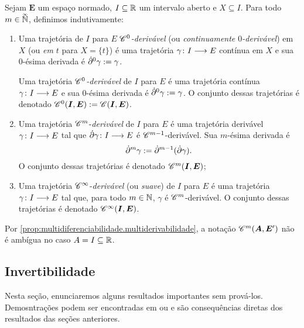 \begin{definition}
Sejam $\bm E$ um espaço normado, $I \subseteq \mathbb{R}$ um intervalo aberto e $X \subseteq I$. Para todo $m \in \accentset{\infty}{\mathbb{N}}$, definimos indutivamente:
	\begin{enumerate}
	\item Uma trajetória de $I$ para $E$ \emph{$\mathscr{C}^0$-derivável} (ou \emph{continuamente $0$-derivável}) em $X$ (ou \emph{em $t$} para $X=\{t\}$) é uma trajetória ${\gamma}\colon {I} \longrightarrow {E}$ contínua em $X$ e sua $0$-ésima derivada é $\dot{\partial}^0 \gamma := \gamma$.

	Uma trajetória \emph{$\mathscr{C}^0$-derivável} de $I$ para $E$ é uma trajetória contínua ${\gamma}\colon {I} \longrightarrow {E}$ e sua $0$-ésima derivada é $\dot{\partial}^0 \gamma := \gamma$. O conjunto dessas trajetórias é denotado $\mathscr{C}^0(\bm I,\bm E) := \mathscr{C}(\bm I,\bm E)$.

	\item

	Uma trajetória $\mathscr{C}^m$-\emph{derivável} de $I$ para $E$ é uma trajetória derivável ${\gamma}\colon {I} \longrightarrow {E}$ tal que ${\dot{\partial} \gamma}\colon {I} \longrightarrow {E}$ é $\mathscr{C}^{m-1}$-derivável. Sua $m$-ésima derivada é
		\begin{equation*}
		\dot{\partial}^m \gamma := \dot{\partial}^{m-1} (\dot{\partial} \gamma).
		\end{equation*}
	O conjunto dessas trajetórias é denotado $\mathscr{C}^m(\bm I,\bm E)$;

	\item

	Uma trajetória $\mathscr{C}^\infty$-\emph{derivável} (ou \emph{suave}) de $I$ para $E$ é uma trajetória ${\gamma}\colon {I} \longrightarrow {E}$ tal que, para todo $m \in \mathbb{N}$, $\gamma$ é $\mathscr{C}^{m}$-derivável. O conjunto dessas trajetórias é denotado $\mathscr{C}^\infty(\bm I,\bm E)$.
	\end{enumerate}
\end{definition}

Por \ref{prop:multidiferenciabilidade.multiderivabilidade}, a notação $\mathscr{C}^m(\bm A,\bm E')$ não é ambígua no caso $A = I \subseteq \mathbb{R}$.












\subsection{Invertibilidade}

Nesta seção, enunciaremos alguns resultados importantes sem prová-los. Demosntrações podem ser encontradas em \cite{liv:Cartan-DifferentialCalculus} ou \cite{liv:Coleman-CalculusNormedVectorSpaces} e são consequências diretas dos resultados das seções anteriores.

